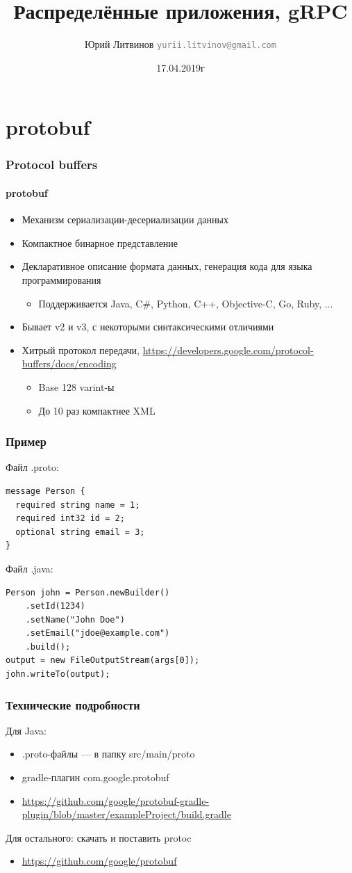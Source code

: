 \documentclass[xetex,mathserif,serif]{beamer}
\title{Распределённые приложения, gRPC}
\author[Юрий Литвинов]{Юрий Литвинов \newline \textcolor{gray}{\small\texttt{yurii.litvinov@gmail.com}}}
\date{17.04.2019г}
\begin{document}
	
	\frame{\titlepage}

	\section{protobuf}

	\begin{frame}
		\frametitle{Protocol buffers}
		\framesubtitle{protobuf}
		\begin{itemize}
			\item Механизм сериализации-десериализации данных
			\item Компактное бинарное представление
			\item Декларативное описание формата данных, генерация кода для языка программирования
			\begin{itemize}
				\item Поддерживается Java, C\#, Python, C++, Objective-C, Go, Ruby, ...
			\end{itemize}
			\item Бывает v2 и v3, с некоторыми синтаксическими отличиями
			\item Хитрый протокол передачи, \url{https://developers.google.com/protocol-buffers/docs/encoding}
			\begin{itemize}
				\item Base 128 varint-ы
				\item До 10 раз компактнее XML 
			\end{itemize}
		\end{itemize}
	\end{frame}

	\begin{frame}[fragile]
		\frametitle{Пример}
		Файл .proto:
		\begin{verbatim}
message Person {
  required string name = 1;
  required int32 id = 2;
  optional string email = 3;
}
		\end{verbatim}
		Файл .java:
		\begin{verbatim}
Person john = Person.newBuilder()
    .setId(1234)
    .setName("John Doe")
    .setEmail("jdoe@example.com")
    .build();
output = new FileOutputStream(args[0]);
john.writeTo(output);
		\end{verbatim}
	\end{frame}

	\begin{frame}
		\frametitle{Технические подробности}
		Для Java:
		\begin{itemize}
			\item .proto-файлы --- в папку src/main/proto
			\item gradle-плагин com.google.protobuf
			\item \url{https://github.com/google/protobuf-gradle-plugin/blob/master/exampleProject/build.gradle}
		\end{itemize}
		Для остального: скачать и поставить protoc
		\begin{itemize}
			\item \url{https://github.com/google/protobuf}
		\end{itemize}
	\end{frame}
\end{document}
